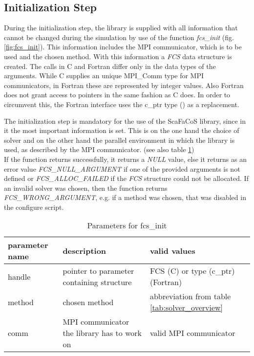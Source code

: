 \subsection{Initialization Step}
\label{sec:init_step}
During the initialization step, the library is supplied with all information that cannot be changed during
the simulation by use of the function \textit{fcs\_init} (fig. \ref{fig:fcs_init}). This information includes 
the MPI communicator, which is to be used and the chosen method.
With this information a \textit{FCS} data structure is created. The calls in C and Fortran differ only in
the data types of the arguments. While C supplies an unique MPI\_Comm type for MPI communicators, in Fortran
these are represented by integer values. Also Fortran does not grant access to pointers in the same fashion
as C does. In order to circumvent this, the Fortran interface uses the c\_ptr type (\cite[p. 565f.]{fortran-handbook})
as a replacement.



The initialization step is mandatory for the use of the ScaFaCoS library, since in it the most important information is
set. This is on the one hand the choice of solver and on the other hand the parallel environment in which the library
is used, as described by the MPI communicator. (see also table \ref{tab:fcs_init_parameters})\\
If the function returns successfully, it returns a \textit{NULL} value, else it returns as an error value \textit{FCS\_NULL\_ARGUMENT} if one
of the provided arguments is not defined or \newline\textit{FCS\_ALLOC\_FAILED} if the \textit{FCS} structure could not be allocated.
If an invalid solver was chosen, then the function returns \textit{FCS\_WRONG\_ARGUMENT}, e.g. if a method was chosen, that
was disabled in the configure script.

\begin{table}
\begin{center}
\begin{tabular}{|p{}|p{}|p{}|}
          \hline
          parameter name        &       description                                         &   valid values                        \\
          \hline
          \hline
          handle                &       pointer to parameter containing structure           &   FCS (C) or type (c\_ptr) (Fortran)   \\
          \hline
          method                &       chosen method                                       &   abbreviation from table \ref{tab:solver_overview} \\
          \hline
          comm                  &       MPI communicator the library has to work on         &   valid MPI communicator              \\
          \hline 
\end{tabular}
\end{center}
\caption{Parameters for fcs\_init}
\label{tab:fcs_init_parameters}
\end{table}

